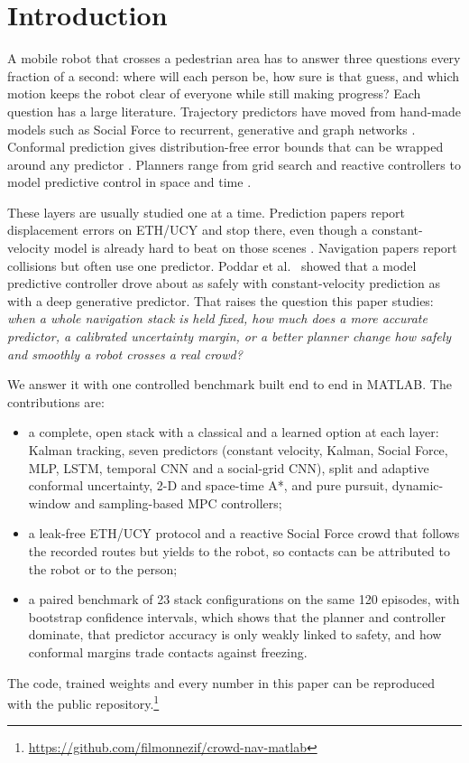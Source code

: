\section{Introduction}
A mobile robot that crosses a pedestrian area has to answer three
questions every fraction of a second: where will each person be, how sure
is that guess, and which motion keeps the robot clear of everyone while
still making progress? Each question has a large literature. Trajectory
predictors have moved from hand-made models such as Social Force
\cite{helbing1995} to recurrent, generative and graph networks
\cite{alahi2016,gupta2018,salzmann2020,rudenko2020}. Conformal prediction
gives distribution-free error bounds that can be wrapped around any
predictor \cite{vovk2005,lindemann2023,dixit2023}. Planners range from
grid search and reactive controllers \cite{hart1968,fox1997} to model
predictive control in space and time \cite{mavrogiannis2023}.

These layers are usually studied one at a time. Prediction papers report
displacement errors on ETH/UCY \cite{pellegrini2009,lerner2007} and stop
there, even though a constant-velocity model is already hard to beat on
those scenes \cite{scholler2020}. Navigation papers report collisions but
often use one predictor. Poddar et al.\ \cite{poddar2023} showed that a
model predictive controller drove about as safely with constant-velocity
prediction as with a deep generative predictor. That raises the question
this paper studies:
\emph{when a whole navigation stack is held fixed, how much does a more
accurate predictor, a calibrated uncertainty margin, or a better planner
change how safely and smoothly a robot crosses a real crowd?}

We answer it with one controlled benchmark built end to end in MATLAB.
The contributions are:
\begin{itemize}
\item a complete, open stack with a classical and a learned option at each
layer: Kalman tracking, seven predictors (constant velocity, Kalman,
Social Force, MLP, LSTM, temporal CNN and a social-grid CNN), split and
adaptive conformal uncertainty, 2-D and space-time A*, and pure pursuit,
dynamic-window and sampling-based MPC controllers;
\item a leak-free ETH/UCY protocol and a reactive Social Force crowd that
follows the recorded routes but yields to the robot, so contacts can be
attributed to the robot or to the person;
\item a paired benchmark of 23 stack configurations on the same 120
episodes, with bootstrap confidence intervals, which shows that the planner
and controller dominate, that predictor accuracy is only weakly linked to
safety, and how conformal margins trade contacts against freezing.
\end{itemize}
The code, trained weights and every number in this paper can be
reproduced with the public repository.\footnote{\url{https://github.com/filmonnezif/crowd-nav-matlab}}

